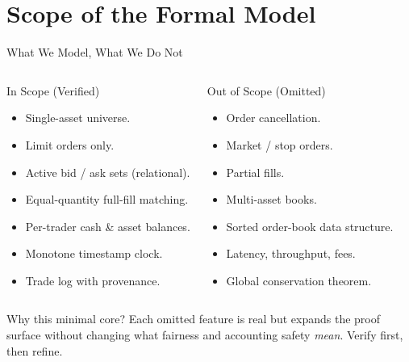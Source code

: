 \section{Scope of the Formal Model}

\begin{frame}{What We Model, What We Do Not}

\begin{columns}[T]
\begin{block}{In Scope (Verified)}
\begin{itemize}
    \item Single-asset universe.
    \item Limit orders only.
    \item Active bid / ask sets (relational).
    \item Equal-quantity full-fill matching.
    \item Per-trader cash \& asset balances.
    \item Monotone timestamp clock.
    \item Trade log with provenance.
\end{itemize}
\end{block}

\begin{block}{Out of Scope (Omitted)}
\begin{itemize}
    \item Order cancellation.
    \item Market / stop orders.
    \item Partial fills.
    \item Multi-asset books.
    \item Sorted order-book data structure.
    \item Latency, throughput, fees.
    \item Global conservation theorem.
\end{itemize}
\end{block}
\end{columns}

\begin{block}{Why this minimal core?}
Each omitted feature is real but expands the proof surface without changing what \alert{fairness} and \alert{accounting safety} \emph{mean}. Verify first, then refine.
\end{block}

\end{frame}
